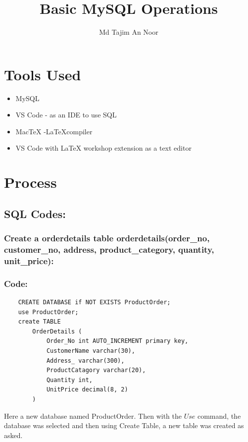 \documentclass[12pt]{article}
\title{Basic MySQL Operations}
\author{Md Tajim An Noor}
\date{}
\begin{document}

\pagebreak

\tableofcontents

\maketitle

\section{Tools Used}
\begin{itemize}
    \item MySQL
    \item VS Code - as an IDE to use SQL
    \item MacTeX -\LaTeX  compiler
    \item VS Code with LaTeX workshop extension as a text editor
\end{itemize}


\section{Process}
\subsection{SQL Codes:}

\vspace{10mm}

\subsubsection{Create a orderdetails table orderdetails(order\_no, customer\_no, address, product\_category, quantity, unit\_price):}
\subsubsection*{Code: }
\begin{verbatim}
    CREATE DATABASE if NOT EXISTS ProductOrder;
    use ProductOrder;
    create TABLE
        OrderDetails (
            Order_No int AUTO_INCREMENT primary key,
            CustomerName varchar(30),
            Address_ varchar(300),
            ProductCatagory varchar(20),
            Quantity int,
            UnitPrice decimal(8, 2)
        )     
\end{verbatim}
Here a new database named ProductOrder. Then with the $Use$ command, the database was selected and then using Create Table, a new table was created as asked.
\end{document}
